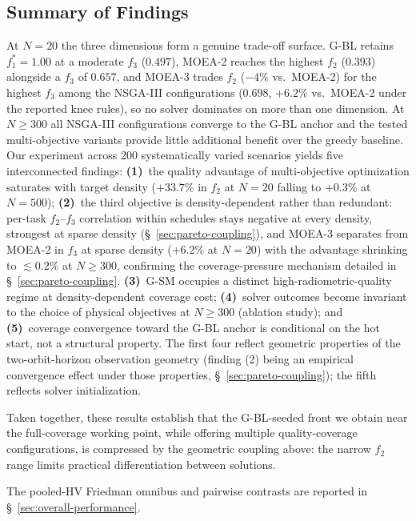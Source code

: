 \documentclass[preprint,12pt,authoryear]{elsarticle}
\begin{document}
\subsection{Summary of Findings}
\label{sec:summary}
At
$N=20$ the three dimensions form a genuine trade-off
surface. G-BL retains $f_1^* = 1.00$ at a moderate $f_3$
($0.497$), MOEA-2 reaches the highest $f_2$ ($0.393$) alongside a
$f_3$ of $0.657$, and MOEA-3 trades $f_2$ ($-4\%$ vs.\ MOEA-2) for the highest $f_3$
among the NSGA-III configurations
($0.698$, $+6.2\%$ vs.\ MOEA-2 under the reported knee rules), so no solver dominates on more than one
dimension. At $N \geq 300$ all NSGA-III configurations converge to the G-BL anchor and
the tested multi-objective variants provide little additional benefit over
the greedy baseline.
Our experiment across 200 systematically varied scenarios yields five
interconnected findings:
\textbf{(1)}~the quality advantage of multi-objective optimization saturates with
target density ($+33.7\%$ in $f_2$ at $N=20$ falling to $+0.3\%$ at $N=500$);
\textbf{(2)}~the third objective is density-dependent rather than redundant:
per-task $f_2$--$f_3$ correlation within schedules stays negative at every
density, strongest at sparse density (\S~\ref{sec:pareto-coupling}), and
MOEA-3 separates from MOEA-2 in $f_3$ at sparse
density ($+6.2\%$ at $N=20$) with the advantage shrinking to $\lesssim 0.2\%$
at $N \geq 300$, confirming the coverage-pressure mechanism detailed in
\S~\ref{sec:pareto-coupling}.
\textbf{(3)}~G-SM occupies a distinct high-radiometric-quality regime at
density-dependent coverage cost;
\textbf{(4)}~solver outcomes become invariant to the choice of physical
objectives at $N \geq 300$ (ablation study); and
\textbf{(5)}~coverage convergence toward the G-BL anchor is conditional
on the hot start, not a structural property. The first four reflect
geometric properties of the two-orbit-horizon observation geometry
(finding (2) being an empirical convergence effect under those
properties, \S~\ref{sec:pareto-coupling}); the fifth reflects solver
initialization.

Taken together, these results establish that
the G-BL-seeded front we obtain near the full-coverage working point, while
offering multiple quality-coverage configurations,
is compressed by the geometric coupling above: the narrow $f_2$ range limits
practical differentiation between solutions.

The pooled-HV Friedman omnibus and pairwise contrasts are reported in
\S~\ref{sec:overall-performance}.
\end{document}
